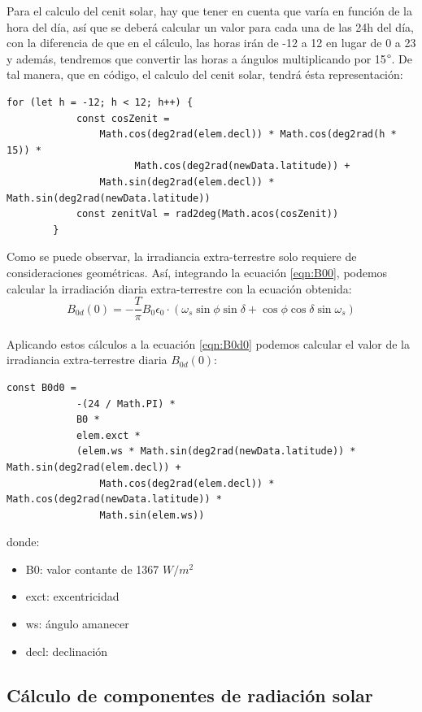 \begin{itemize}
Para el calculo del cenit solar, hay que tener en cuenta que varía en función de la hora del día, así que se deberá calcular un valor para cada una de las 24h del día, con la diferencia de que en el cálculo, las horas irán de -12 a 12 en lugar de 0 a 23 y además, tendremos que convertir las horas a ángulos multiplicando por 15$\degree$. De tal manera, que en código, el calculo del cenit solar, tendrá ésta representación:\\
\begin{lstlisting}[style=ES6, caption={Cálculo del cenit solar}]
		for (let h = -12; h < 12; h++) {
			const cosZenit =
				Math.cos(deg2rad(elem.decl)) * Math.cos(deg2rad(h * 15)) * 	
					  Math.cos(deg2rad(newData.latitude)) +
				Math.sin(deg2rad(elem.decl)) * Math.sin(deg2rad(newData.latitude))
			const zenitVal = rad2deg(Math.acos(cosZenit))
		}
\end{lstlisting}
\end{itemize}

Como se puede observar, la irradiancia extra-terrestre solo requiere de consideraciones geométricas. Así, integrando la ecuación \ref{eqn:B00}, podemos calcular la irradiación diaria extra-terrestre con la ecuación obtenida:\\
\begin{equation}\label{eqn:B0d0}
B_{0d}(0)=-\frac{T}{\pi}B_0\epsilon_0·(\omega_s\sin\phi\sin\delta + \cos\phi\cos\delta\sin\omega_s)
\end{equation}\\

Aplicando estos cálculos a la ecuación \ref{eqn:B0d0} podemos calcular el valor de la irradiancia extra-terrestre diaria $B_{0d}(0)$:
\begin{lstlisting}[style=ES6, caption={Equación para B0d0}]
		const B0d0 =
			-(24 / Math.PI) *
			B0 *
			elem.exct *
			(elem.ws * Math.sin(deg2rad(newData.latitude)) * Math.sin(deg2rad(elem.decl)) +
				Math.cos(deg2rad(elem.decl)) * Math.cos(deg2rad(newData.latitude)) * 
				Math.sin(elem.ws))
\end{lstlisting}
donde:
\begin{itemize}
\item B0: valor contante de 1367 $W/m^2$
\item exct: excentricidad
\item ws: ángulo amanecer
\item decl: declinación
\end{itemize}


\subsection{Cálculo de componentes de radiación solar}
\label{section:radiation_components}


